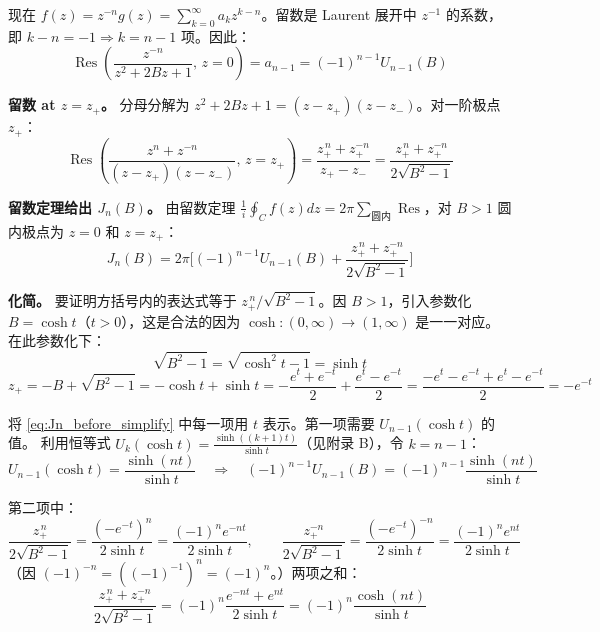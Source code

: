 \documentclass[12pt,a4paper]{ctexart}
\begin{document}
现在 $f(z)=z^{-n}g(z)=\sum_{k=0}^{\infty}a_k z^{k-n}$。留数是 Laurent 展开中 $z^{-1}$ 的系数，
即 $k-n=-1\Rightarrow k=n-1$ 项。因此：
\begin{equation}\label{eq:res0_app}
\operatorname{Res}\!\left(\frac{z^{-n}}{z^2+2Bz+1},\,z=0\right)=a_{n-1}=(-1)^{n-1}U_{n-1}(B)
\end{equation}

\medskip
\noindent\textbf{留数 at $z=z_+$。}
分母分解为 $z^2+2Bz+1=(z-z_+)(z-z_-)$。对一阶极点 $z_+$：
\begin{equation}
\operatorname{Res}\!\left(\frac{z^n+z^{-n}}{(z-z_+)(z-z_-)},\,z=z_+\right)
=\frac{z_+^{\,n}+z_+^{-n}}{z_+-z_-}
=\frac{z_+^{\,n}+z_+^{-n}}{2\sqrt{B^2-1}}
\end{equation}

\medskip
\noindent\textbf{留数定理给出 $J_n(B)$。}
由留数定理 $\frac{1}{i}\oint_C f(z)dz=2\pi\sum_{\text{圆内}}\operatorname{Res}$，对 $B>1$ 圆内极点为 $z=0$ 和 $z=z_+$：
\begin{equation}\label{eq:Jn_before_simplify}
J_n(B)=2\pi\Big[(-1)^{n-1}U_{n-1}(B)+\frac{z_+^{\,n}+z_+^{-n}}{2\sqrt{B^2-1}}\Big]
\end{equation}

\medskip
\noindent\textbf{化简。}
要证明方括号内的表达式等于 $z_+^{\,n}/\sqrt{B^2-1}$。因 $B>1$，引入参数化 $B=\cosh t$（$t>0$），这是合法的因为 $\cosh:(0,\infty)\to(1,\infty)$ 是一一对应。在此参数化下：
\begin{equation}
\sqrt{B^2-1}=\sqrt{\cosh^2 t-1}=\sinh t
\end{equation}
\begin{equation}
z_+=-B+\sqrt{B^2-1}=-\cosh t+\sinh t
     =-\frac{e^t+e^{-t}}{2}+\frac{e^t-e^{-t}}{2}
     =\frac{-e^t-e^{-t}+e^t-e^{-t}}{2}=-e^{-t}
\end{equation}

将 \eqref{eq:Jn_before_simplify} 中每一项用 $t$ 表示。第一项需要 $U_{n-1}(\cosh t)$ 的值。
利用恒等式 $U_k(\cosh t)=\frac{\sinh((k+1)t)}{\sinh t}$（见附录 B），令 $k=n-1$：
\begin{equation}
U_{n-1}(\cosh t)=\frac{\sinh(nt)}{\sinh t}
\quad\Longrightarrow\quad
(-1)^{n-1}U_{n-1}(B)=(-1)^{n-1}\frac{\sinh(nt)}{\sinh t}
\end{equation}

第二项中：
\begin{equation}
\frac{z_+^{\,n}}{2\sqrt{B^2-1}}=\frac{(-e^{-t})^n}{2\sinh t}=\frac{(-1)^n e^{-nt}}{2\sinh t},\qquad
\frac{z_+^{-n}}{2\sqrt{B^2-1}}=\frac{(-e^{-t})^{-n}}{2\sinh t}=\frac{(-1)^n e^{nt}}{2\sinh t}
\end{equation}
（因 $(-1)^{-n}=((-1)^{-1})^n=(-1)^n$。）两项之和：
\begin{equation}
\frac{z_+^{\,n}+z_+^{-n}}{2\sqrt{B^2-1}}
=(-1)^n\frac{e^{-nt}+e^{nt}}{2\sinh t}
=(-1)^n\frac{\cosh(nt)}{\sinh t}
\end{equation}
\end{document}
